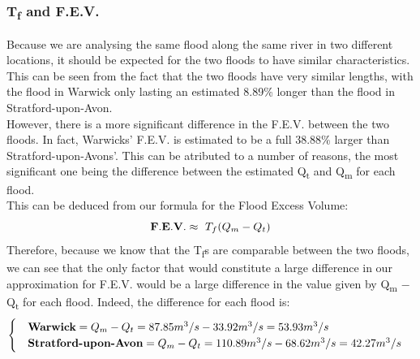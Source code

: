 \documentclass[11 pt, a4paper]{article}
\begin{document}
\subsubsection{T\textsubscript{f} and F.E.V.}
Because we are analysing the same flood along the same river in two different locations, it should be expected for the two floods to have similar characteristics. This can be seen from the fact that the two floods have very similar lengths, with the flood in Warwick only lasting an estimated 8.89\% longer than the flood in Stratford-upon-Avon.\\ However, there is a more significant difference in the F.E.V. between the two floods. In fact, Warwicks' F.E.V. is estimated to be a full 38.88\% larger than Stratford-upon-Avons'. This can be atributed to a number of reasons, the most significant one being the difference between the estimated Q\textsubscript{t} and Q\textsubscript{m} for each flood.\\
This can be deduced from our formula for the Flood Excess Volume:
\[{\bf F.E.V.}\approx\ T_f (Q_m - Q_t)\]
Therefore, because we know that the T\textsubscript{f}s are comparable between the two floods, we can see that the only factor that would constitute a large difference in our approximation for F.E.V. would be a large difference in the value given by Q\textsubscript{m} $-$ Q\textsubscript{t} for each flood. Indeed, the difference for each flood is:
\[
\begin{cases}
\ \ \ \text{\bf Warwick} = Q_m-Q_t = 87.85m^3 /s-33.92m^3 /s = 53.93m^3 /s\\
\ \ \ \text{\bf Stratford-upon-Avon} = Q_m-Q_t = 110.89m^3 /s-68.62m^3 /s = 42.27m^3 /s\\
\end{cases}
\]
\end{document}
